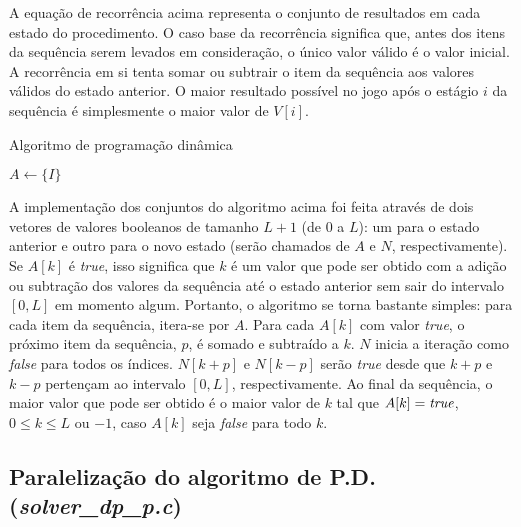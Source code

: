\documentclass[10pt,a4paper]{article}
\numberwithin{equation}{section}
\begin{document}
A equação de recorrência acima representa o conjunto de resultados em cada estado do procedimento. O caso base da recorrência significa que, antes dos itens da sequência serem levados em consideração, o único valor válido é o valor inicial. A recorrência em si tenta somar ou subtrair o item da sequência aos valores válidos do estado anterior. O maior resultado possível no jogo após o estágio $i$ da sequência é simplesmente o maior valor de $V[i]$.

\begin{algorithm}[H]
    \caption{Algoritmo de programação dinâmica}


    \BlankLine
    $A \gets \{I\}$\;
\end{algorithm}

A implementação dos conjuntos do algoritmo acima foi feita através de dois vetores de valores booleanos de tamanho $L + 1$ (de $0$ a $L$): um para o estado anterior e outro para o novo estado (serão chamados de $A$ e $N$, respectivamente). Se $A[k]$ é \emph{true}, isso significa que $k$ é um valor que pode ser obtido com a adição ou subtração dos valores da sequência até o estado anterior sem sair do intervalo $[0,L]$ em momento algum. Portanto, o algoritmo se torna bastante simples: para cada item da sequência, itera-se por $A$. Para cada $A[k]$ com valor \emph{true}, o próximo item da sequência, $p$, é somado e subtraído a $k$. $N$ inicia a iteração como \emph{false} para todos os índices. $N[k+p]$ e $N[k-p]$ serão \emph{true} desde que $k+p$ e $k-p$ pertençam ao intervalo $[0,L]$, respectivamente. Ao final da sequência, o maior valor que pode ser obtido é o maior valor de $k$ tal que $A[k]=\text{\emph{true}}$, $0 \le k \le L$ ou $-1$, caso $A[k]$ seja \emph{false} para todo $k$.

\subsection{Paralelização do algoritmo de P.D. (\emph{solver\_dp\_p.c})}
\end{document}
